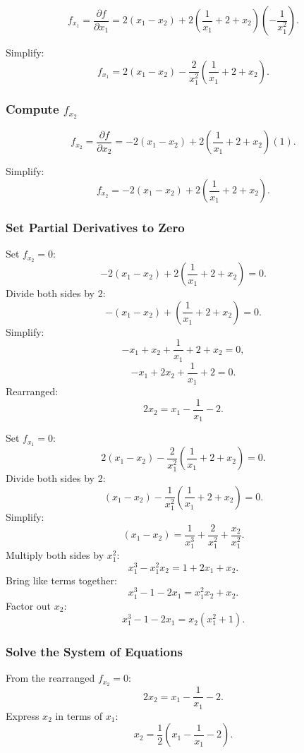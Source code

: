 \documentclass[11pt]{article}
\begin{document}
\[
f_{x_1} = \frac{\partial f}{\partial x_1} = 2(x_1 - x_2) + 2\left( \frac{1}{x_1} + 2 + x_2 \right) \left( -\frac{1}{x_1^2} \right).
\]

Simplify:
\[
f_{x_1} = 2(x_1 - x_2) - \frac{2}{x_1^2} \left( \frac{1}{x_1} + 2 + x_2 \right).
\]

\newpage

\subsubsection{Compute \( f_{x_2} \)}

\[
f_{x_2} = \frac{\partial f}{\partial x_2} = -2(x_1 - x_2) + 2\left( \frac{1}{x_1} + 2 + x_2 \right)(1).
\]

Simplify:
\[
f_{x_2} = -2(x_1 - x_2) + 2\left( \frac{1}{x_1} + 2 + x_2 \right).
\]

\newpage

\subsubsection{Set Partial Derivatives to Zero}

Set \( f_{x_2} = 0 \):
\[
-2(x_1 - x_2) + 2\left( \frac{1}{x_1} + 2 + x_2 \right) = 0.
\]
Divide both sides by 2:
\[
-(x_1 - x_2) + \left( \frac{1}{x_1} + 2 + x_2 \right) = 0.
\]
Simplify:
\[
-x_1 + x_2 + \frac{1}{x_1} + 2 + x_2 = 0,
\]
\[
- x_1 + 2 x_2 + \frac{1}{x_1} + 2 = 0.
\]
Rearranged:
\[
2 x_2 = x_1 - \frac{1}{x_1} - 2.
\]

Set \( f_{x_1} = 0 \):
\[
2(x_1 - x_2) - \frac{2}{x_1^2} \left( \frac{1}{x_1} + 2 + x_2 \right) = 0.
\]
Divide both sides by 2:
\[
(x_1 - x_2) - \frac{1}{x_1^2} \left( \frac{1}{x_1} + 2 + x_2 \right) = 0.
\]
Simplify:
\[
(x_1 - x_2) = \frac{1}{x_1^3} + \frac{2}{x_1^2} + \frac{x_2}{x_1^2}.
\]
Multiply both sides by \( x_1^2 \):
\[
x_1^3 - x_1^2 x_2 = 1 + 2 x_1 + x_2.
\]
Bring like terms together:
\[
x_1^3 - 1 - 2 x_1 = x_1^2 x_2 + x_2.
\]
Factor out \( x_2 \):
\[
x_1^3 - 1 - 2 x_1 = x_2 ( x_1^2 + 1 ).
\]

\newpage

\subsubsection{Solve the System of Equations}

From the rearranged \( f_{x_2} = 0 \):
\[
2 x_2 = x_1 - \frac{1}{x_1} - 2.
\]
Express \( x_2 \) in terms of \( x_1 \):
\[
x_2 = \frac{1}{2} \left( x_1 - \frac{1}{x_1} - 2 \right).
\]
\end{document}

